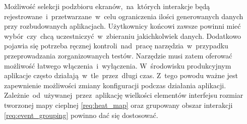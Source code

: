 \begin{enumerate}[label=\textbf{F.\arabic*}]
	 Możliwość selekcji podzbioru ekranów,~na~których interakcje będą rejestrowane~i~przetwarzane~w~celu ograniczenia ilości generowanych danych przy rozbudowanych aplikacjach.
	 Użytkownicy końcowi zawsze powinni mieć wybór~czy~chcą uczestniczyć~w~zbieraniu jakichkolwiek danych. Dodatkowo pojawia się potrzeba ręcznej kontroli~nad~pracę narzędzia~w~przypadku przeprowadzania zorganizowanych testów. Narzędzie musi zatem oferować możliwość łatwego włączenia~i~wyłączenia.
	 W~środowisku produkcyjnym aplikacje często działają~w~tle~przez~długi czas. Z~tego powodu ważne jest zapewnienie możliwości zmiany konfiguracji podczas działania aplikacji.
	 Zależnie~od~używanej~przez~aplikację wielkości elementów interfejsu rozmiar tworzonej mapy cieplnej \ref{req:heat_map} oraz grupowany obszar interakcji \ref{req:event_grouping} powinno dać się dostosować. 
\end{enumerate}
